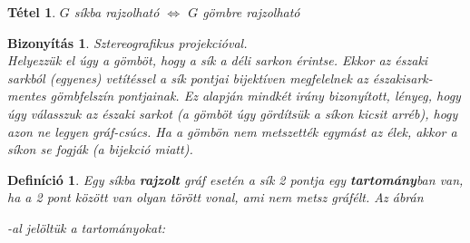 \documentclass[a4paper,12pt,twoside]{book}
\newtheorem{defi}{Definíció}[chapter]
\newtheorem{tetel}{Tétel}[chapter]
\newtheorem{biz}{Bizonyítás}[chapter]
\theoremstyle{break}
\begin{document}
\begin{tetel}
 $G$ síkba rajzolható $\Leftrightarrow$ $G$ gömbre rajzolható
\end{tetel}
\begin{biz} \textit{Sztereografikus projekcióval}.\\
 Helyezzük el úgy a gömböt, hogy a sík a déli sarkon érintse. Ekkor az északi sarkból (egyenes) vetítéssel a sík pontjai bijektíven megfelelnek az északisark-mentes gömbfelszín pontjainak. Ez alapján mindkét irány bizonyított, lényeg, hogy úgy válasszuk az északi sarkot (a gömböt úgy gördítsük a síkon kicsit arréb), hogy azon ne legyen gráf-csúcs. Ha a gömbön nem metszették egymást az élek, akkor a síkon se fogják (a bijekció miatt).
\end{biz}

\begin{defi}
 Egy \emph{síkba \textbf{rajzolt} gráf} esetén a sík 2 pontja egy \textbf{tartomány}ban van, ha a 2 pont között van olyan törött vonal, ami nem metsz gráfélt. Az ábrán
 -al jelöltük a tartományokat:

\begin{center}
\vspace*{-35pt}
\end{center}
\end{defi}
\end{document}
